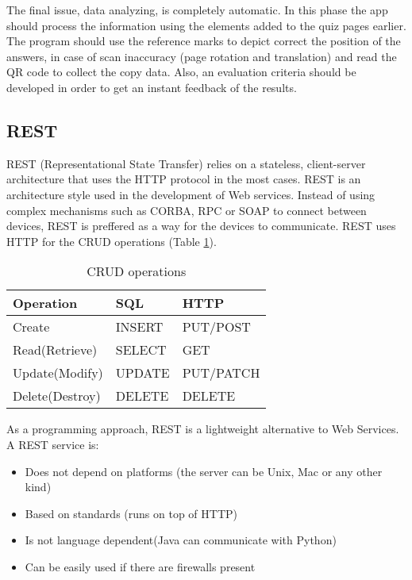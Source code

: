 The final issue, data analyzing, is completely automatic. In this phase the app should process 
the information using the elements added to the quiz pages earlier. The program should use the 
reference marks to depict correct the position of the answers, in case of scan inaccuracy (page rotation and translation) and read the QR code to collect the copy data. Also, an evaluation criteria should be developed 
in order to get an instant feedback of the results.

\subsection{REST}
REST (Representational State Transfer) relies on a stateless, client-server architecture that uses the HTTP protocol in the most cases.
REST is an architecture style used in the development of Web services. Instead of using complex mechanisms such as CORBA, RPC or SOAP to connect between devices, REST is preffered as a way for the devices to communicate.
REST uses HTTP for the CRUD operations (Table \ref{crud_operations}).
\begin{table}[ht!]
\centering
\caption{CRUD operations}
{
\renewcommand{\arraystretch}{1.25}
\begin{tabular}{ lll }

  Operation & SQL & HTTP \\ \hline
  Create &  INSERT & PUT/POST \\
  Read(Retrieve) & SELECT & GET \\
  Update(Modify) & UPDATE & PUT/PATCH \\
  Delete(Destroy) & DELETE & DELETE \\

\end{tabular}
}
\label{crud_operations}
\end{table}

As a programming approach, REST is a lightweight alternative to Web Services.
A REST service is:
\begin{itemize}
  \item Does not depend on platforms (the server can be Unix, Mac or any other kind)
  \item Based on standards (runs on top of HTTP)
  \item Is not language dependent(Java can communicate with Python)
  \item Can be easily used if there are firewalls present
\end{itemize}

